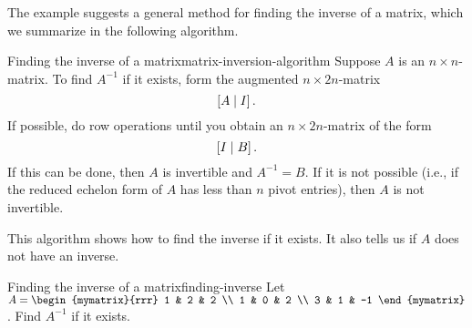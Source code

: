 The example suggests a general method for finding the inverse of a
matrix, which we summarize in the following algorithm.

\begin{algorithm}{Finding the inverse of a matrix}{matrix-inversion-algorithm}
  Suppose $A$ is an $n\times n$-matrix. To find $A^{-1}$ if it
  exists, form the augmented
  $n\times 2n$-matrix
  \begin{equation*}
    \left[A\mid I\right].
  \end{equation*}
  If possible, do row operations until you obtain an
  $n\times 2n$-matrix of the form
  \begin{equation*}
    \left[I\mid B\right].
  \end{equation*}
  If this can be done, then $A$ is invertible and $A^{-1}=B$. If it is
  not possible (i.e., if the reduced echelon form of $A$ has less than
  $n$ pivot entries), then $A$ is not invertible.
\end{algorithm}

This algorithm shows how to find the inverse if it exists. It also
tells us if $A$ does not have an inverse.

\begin{example}{Finding the inverse of a matrix}{finding-inverse}
  Let $A=\begin{mymatrix}{rrr}
    1 & 2 & 2 \\
    1 & 0 & 2 \\
    3 & 1 & -1
  \end{mymatrix}$. Find $A^{-1}$ if it exists.
\end{example}

